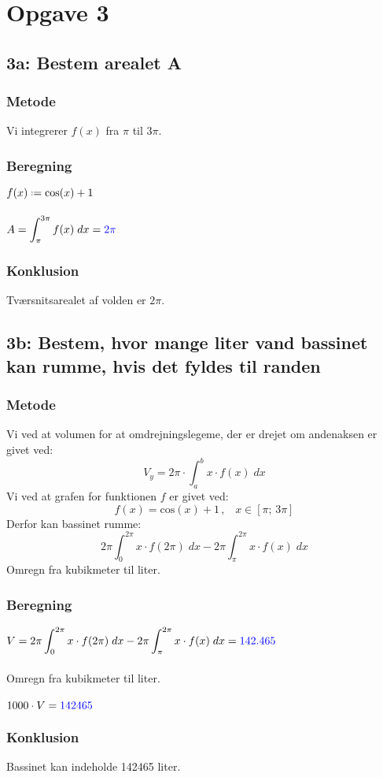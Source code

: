 \documentclass[../main.tex]{subfiles}
\begin{document}
\section*{Opgave 3}
    \subsection*{3a: Bestem arealet A}
        \subsubsection*{Metode}
            Vi integrerer \(f(x)\) fra \(\pi\) til \(3\pi\).
        \subsubsection*{Beregning}
            \(f(x) \defeq \text{cos}(x)+1\)\\\\
            \(\displaystyle A = \int_\pi ^{3\pi} f(x) \; dx = \textcolor{blue}{2\pi}\)\\
        \subsubsection*{Konklusion}
            Tværsnitsarealet af volden er \(2\pi\).
\vspace*{1 cm}
    \subsection*{3b: Bestem, hvor mange liter vand bassinet kan rumme, hvis det fyldes til randen}
        \subsubsection*{Metode}
            Vi ved at volumen for at omdrejningslegeme, der er drejet om andenaksen er givet ved:
            \[V_y=2\pi \cdot \int _a ^b x\cdot f(x)\; dx\]
            Vi ved at grafen for funktionen \(f\) er givet ved:
            \[f(x)=\text{cos}(x)+1\, , \;\;\; x \in [\pi;\,3\pi]\]
            Derfor kan bassinet rumme:
            \[2\pi\int _0 ^{2\pi}x\cdot f(2\pi)\; dx-2\pi \int _\pi ^{2\pi} x\cdot f(x)\; dx\]
            Omregn fra kubikmeter til liter.
        \subsubsection*{Beregning}
            \(\displaystyle V=2\pi\int _0 ^{2\pi}x\cdot f(2\pi)\; dx-2\pi \int _\pi ^{2\pi} x\cdot f(x)\; dx=\textcolor{blue}{142.465}\)\\\\
            Omregn fra kubikmeter til liter.\\\\
            \(1000 \cdot V = \textcolor{blue}{142465}\)
        \subsubsection*{Konklusion}
            Bassinet kan indeholde 142465 liter.
\end{document}
